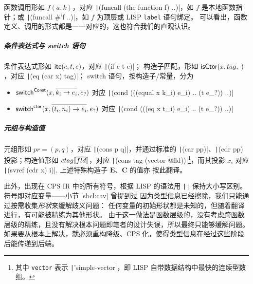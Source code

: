 函数调用形如 $f(a, k)$，对应 \texttt|(funcall (the function f) ..)|，如 $f$ 是本地函数指针；或 \texttt|(funcall #'f ..)|，如 $f$ 为顶层或 LISP \texttt{label} 语句绑定。
可以看出，函数定义、调用的形式都是一一对应的，这也符合我们的直观认识。
\subparagraph*{条件表达式与 switch 语句} 条件表达式形如 $\mathsf{ite}(c,t,e)$，对应 \texttt|(if c t e)|；
构造子匹配，形如 $\mathsf{isCtor}(x, tag, \cdot)$，对应 \texttt|(eq (car x) tag)|；
switch 语句，按构造子/常量，分为
\begin{itemize}\itemsep-.8em
  \item $\mathsf{switch}^{\mathsf{Const}}(x, \overline{k_i \to e_i}, e_?)$ 对应
    \texttt|(cond (((equal x k_i) e_i) .. (t e_?)) ..)|
  \item $\mathsf{switch}^{\mathsf{ctor}}(x, \overline{(t_i, n_i) \to e_i}, e_?)$ 对应
    \texttt|(cond (((eq x t_i) e_i) .. (t e_?)) ..)|
\end{itemize}
{\setlength{\parskip}{-1em}
  \subparagraph*{元组与构造值} 元组形如 $pr = (p, q)$，对应 \texttt|(cons p q)|，并通过标准的
  \texttt|(car pp)|、\texttt|(cdr pp)| 投影；构造值形如 $ctag\llbracket \overline{fld} \rrbracket$，对应
  \texttt|(cons tag (vector @fld))|\footnote{
    其中 \texttt{vector} 表示 \texttt|'simple-vector|，即 LISP 自带数据结构中最快的连续型数组。
  }，而其投影 $x_i$ 对应 \texttt|(svref (cdr x) i)|. 上述特殊构造子 $\mathbf{E}$、$\mathbf{C}$ 的值亦
按此翻译。}
\endgroup

此外，出现在 CPS IR 中的所有符号，根据 LISP 的语法用 \texttt{||} 保持大小写区别。符号即对应变量——小节 \ref{sbcl:cav} 曾提到过
因为类型信息已经擦除，我们只能通过按需收集\emph{形状}来缓解歧义问题：
任何变量的初始形状都是未知的，但随着翻译进行，有可能被精练为其他形状。
由于这一做法是函数层级的，没有考虑跨函数层级的精练，且没有解决根本问题即笔者的设计失误，所以最终只能够缓解问题。
如果要从根本上解决，就必须重构降级、CPS 化，使得类型信息在经过这些阶段后能传递到后端。
